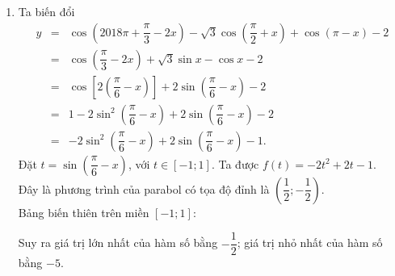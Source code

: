 \begin{bt}
{\begin{enumerate}
	\item Ta biến đổi
	\begin{eqnarray*}
	y&=&\cos\left(2018\pi+ \dfrac{\pi}{3}-2x\right)-\sqrt{3}\cos\left( \dfrac{\pi}{2}+x\right)+\cos\left( \pi-x\right)-2\\
	&=&\cos\left( \dfrac{\pi}{3}-2x\right)+ \sqrt{3}\sin x - \cos x-2\\
	&=& \cos \left[2\left(\dfrac{\pi}{6}-x\right)\right]+2\sin \left(\dfrac{\pi}{6}-x \right)-2\\
	&=& 1-2\sin^2\left(\dfrac{\pi}{6}-x\right)+2\sin \left(\dfrac{\pi}{6}-x \right)-2\\
	&=& -2\sin^2\left(\dfrac{\pi}{6}-x\right)+2\sin \left(\dfrac{\pi}{6}-x \right)-1.
	\end{eqnarray*}
	Đặt $t=\sin \left(\dfrac{\pi}{6}-x \right)$, với $t \in \left[-1;1\right]$. Ta được $f(t)=-2t^2+2t-1$.\\
	Đây là phương trình của parabol có tọa độ đỉnh là $\left(\dfrac{1}{2};-\dfrac{1}{2}\right)$.\\
	Bảng biến thiên trên miền $\left[-1;1\right]$:
	\begin{center}
	\end{center}
	Suy ra giá trị lớn nhất của hàm số bằng $-\dfrac{1}{2}$; giá trị nhỏ nhất của hàm số bằng $-5$.
	\end{enumerate}
}
\end{bt}

